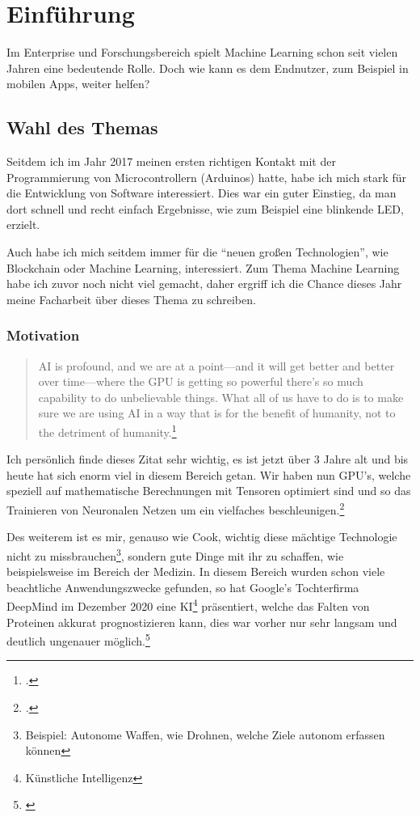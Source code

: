 \section{Einführung}
Im Enterprise und Forschungsbereich spielt Machine Learning schon seit vielen Jahren eine bedeutende Rolle. Doch wie kann es dem Endnutzer, zum Beispiel in mobilen Apps, weiter helfen?

\subsection{Wahl des Themas}

Seitdem ich im Jahr 2017 meinen ersten richtigen Kontakt mit der Programmierung von Microcontrollern (Arduinos) hatte, habe ich mich stark für die Entwicklung von Software interessiert. Dies war ein guter Einstieg, da man dort schnell und recht einfach Ergebnisse, wie zum Beispiel eine blinkende LED, erzielt.

Auch habe ich mich seitdem immer für die "`neuen großen Technologien"', wie Blockchain oder Machine Learning, interessiert. Zum Thema Machine Learning habe ich zuvor noch nicht viel gemacht, daher ergriff ich die Chance dieses Jahr meine Facharbeit über dieses Thema zu schreiben.

\subsubsection{Motivation}

\begin{quotation}
    AI is profound, and we are at a point—and it will get better and better over time—where the GPU is getting so powerful there’s so much capability to do unbelievable things. What all of us have to do is to make sure we are using AI in a way that is for the benefit of humanity, not to the detriment of humanity.\footcite[Tim Cook (CEO von Apple) In einem Interview mit MIT Technology Review]{timcookquote}
\end{quotation}

Ich persönlich finde dieses Zitat sehr wichtig, es ist jetzt über 3 Jahre alt und bis heute hat sich enorm viel in diesem Bereich getan. Wir haben nun GPU's, welche speziell auf mathematische Berechnungen mit Tensoren optimiert sind und so das Trainieren von Neuronalen Netzen um ein vielfaches beschleunigen.\footcite[NVIDIA Grafikprozessoren mit integrierten Tensor Kernen]{nvidiatensorcores}

Des weiterem ist es mir, genauso wie Cook, wichtig diese mächtige Technologie nicht zu missbrauchen\footnote[3]{Beispiel: Autonome Waffen, wie Drohnen, welche Ziele autonom erfassen können}, sondern gute Dinge mit ihr zu schaffen, wie beispielsweise im Bereich der Medizin. In diesem Bereich wurden schon viele beachtliche Anwendungszwecke gefunden, so hat Google's Tochterfirma DeepMind im Dezember 2020 eine KI\footnote[4]{Künstliche Intelligenz} präsentiert, welche das Falten von Proteinen akkurat prognostizieren kann, dies war vorher nur sehr langsam und deutlich ungenauer möglich.\footnote[5]{\cite{deepmindprotein}}

